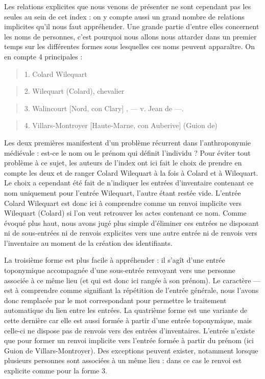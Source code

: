 \documentclass[a4paper,12pt,twoside]{book}
\begin{document}
	Les relations explicites que nous venons de présenter ne sont cependant pas les seules au sein de cet index : on y compte aussi un grand nombre de relations implicites qu'il nous faut appréhender. Une grande partie d'entre elles concernent les noms de personnes, c'est pourquoi nous allons nous attarder dans un premier temps sur les différentes formes sous lesquelles ces noms peuvent apparaître. On en compte 4 principales :
	
	\begin{quotation}
		1. Colard Wilequart
	\end{quotation}

	\begin{quotation}
		2. Wilequart (Colard), chevalier
	\end{quotation}

	\begin{quotation}
		3. Walincourt [Nord, con Clary] , — v. Jean de —.
	\end{quotation}

	\begin{quotation}
		4. Villars-Montroyer [Haute-Marne, con Auberive] (Guion	de)
	\end{quotation}
	
	\noindent Les deux premières manifestent d'un problème récurrent dans l'anthroponymie médiévale : est-ce le nom ou le prénom qui définit l'individu ? Pour éviter tout problème à ce sujet, les auteurs de l'index ont ici fait le choix de prendre en compte les deux et de ranger \og Colard Wilequart\fg{} à la fois à \og Colard\fg{} et à \og Wilequart\fg{}. Le choix a cependant été fait de n'indiquer les entrées d'inventaire contenant ce nom uniquement pour l'entrée \og Wilequart\fg{}, l'autre étant restée vide. L'entrée \og Colard Wilequart\fg{} est donc ici à comprendre comme un renvoi implicite vers \og Wilequart (Colard)\fg{} si l'on veut retrouver les actes contenant ce nom. Comme évoqué plus haut, nous avons jugé plus simple d'éliminer ces entrées ne disposant ni de sous-entrées ni de renvois explicites vers une autre entrée ni de renvois vers l'inventaire au moment de la création des identifiants.
	
	La troisième forme est plus facile à appréhender : il s'agît d'une entrée toponymique accompagnée d'une sous-entrée renvoyant vers une personne associée à ce même lieu (et qui est donc ici rangée à son prénom). Le caractère \og —\fg{} est à comprendre comme signifiant la répétition de l'entrée générale, nous l'avons donc remplacée par le mot correspondant pour permettre le traitement automatique du lien entre les entrées. La quatrième forme est une variante de cette dernière car elle est aussi formée à partir d'une entrée toponymique, mais celle-ci ne dispose pas de renvois vers des entrées d'inventaires. L'entrée n'existe que pour former un renvoi implicite vers l'entrée formée à partir du prénom (ici \og Guion de Villars-Montroyer\fg{}). Des exceptions peuvent exister, notamment lorsque plusieurs personnes sont associées à un même lieu : dans ce cas le renvoi est explicite comme pour la forme 3.
	
\end{document}
